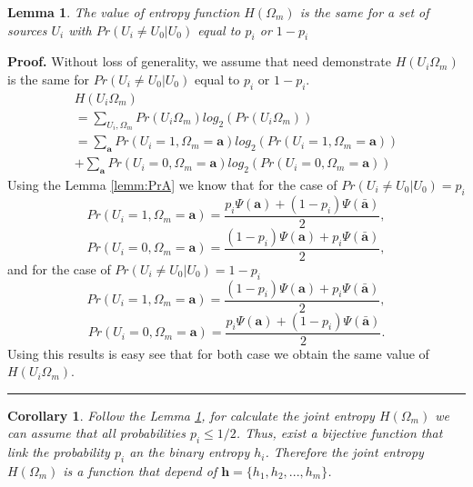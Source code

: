 \documentclass[a4paper,10pt]{article}
\newtheorem{corollary}[mytheorem]{Corollary}
\newtheorem{mylemma}[mytheorem]{Lemma}
\newenvironment{myproof}[1][Proof]{\textbf{#1.} }{\ \rule{0.5em}{0.5em}}
\begin{document}
\begin{mdframed}[style=MDFStyGrayScreen]
\begin{mylemma}
\label{lemm:hpi} 
The value of entropy function $H(\Omega_m)$ is the same for a set of sources
$U_i$ with $Pr(U_i\neq U_0|U_0)$ equal to $p_i$ or $1-p_i$
\end{mylemma}
\end{mdframed}
\begin{myproof}
 \label{proof:hpi} 
Without loss of generality, we assume that need demonstrate $H(U_i\Omega_{m})$
is the same for $Pr(U_i\neq U_0|U_0)$ equal to $p_i$ or $1-p_i$.
\begin{equation}\label{eq:hpi1}
\begin{matrix}
H(U_i\Omega_{m})\\
=\sum \limits_{U_i,\Omega_{m}} Pr(U_i\Omega_{m}) log_2(Pr(U_i\Omega_{m})) ~~~~~~~~~~~~~~~~~~~~\\
=\sum \limits_{\mathbf{a}} Pr(U_i=1,\Omega_{m}=\mathbf{a}) log_2(Pr(U_i=1,\Omega_{m}=\mathbf{a}))\\
+\sum \limits_{\mathbf{a}} Pr(U_i=0,\Omega_{m}=\mathbf{a}) log_2(Pr(U_i=0,\Omega_{m}=\mathbf{a}))
\end{matrix}
\end{equation}
Using the Lemma \ref{lemm:PrA} we know that for the case of $Pr(U_i\neq U_0|U_0)=p_i$ 
\begin{equation}\label{eq:hpi2}
Pr(U_i=1,\Omega_m=\mathbf{a})=\frac{ p_i\Psi(\mathbf{a}) + (1-p_i)\Psi(\mathbf{\bar{a}}) }{2},
\end{equation}
\begin{equation}\label{eq:hpi3}
Pr(U_i=0,\Omega_m=\mathbf{a})=\frac{ (1-p_i)\Psi(\mathbf{a}) + p_i\Psi(\mathbf{\bar{a}}) }{2},
\end{equation}
and for the case of $Pr(U_i\neq U_0|U_0)=1-p_i$
\begin{equation}\label{eq:hpi4}
Pr(U_i=1,\Omega_m=\mathbf{a})=\frac{ (1-p_i)\Psi(\mathbf{a}) + p_i\Psi(\mathbf{\bar{a}}) }{2},
\end{equation}
\begin{equation}\label{eq:hpi5}
Pr(U_i=0,\Omega_m=\mathbf{a})=\frac{ p_i\Psi(\mathbf{a}) + (1-p_i)\Psi(\mathbf{\bar{a}}) }{2}.
\end{equation}
Using this results is easy see that for both case  we obtain the same value of 
$H(U_i\Omega_{m})$.
\end{myproof}
\begin{corollary}
 \label{coro:hpi} 
Follow the Lemma \ref{lemm:hpi}, for calculate the joint entropy $H(\Omega_m)$ 
we can assume that all probabilities $p_i \leq 1/2$. Thus, exist a bijective 
function that link the probability $p_i$ an the binary entropy $h_i$. Therefore
the joint entropy $H(\Omega_m)$ is a function that depend of $\mathbf{h}=\{h_1, h_2, ..., h_m\}$.
\end{corollary}
\end{document}
